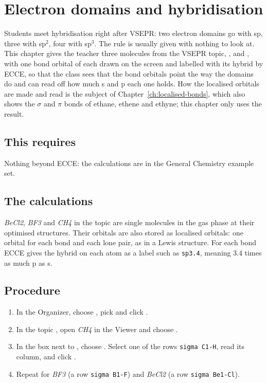 \chapter{Electron domains and hybridisation}
\label{ch:t-hybridisation}

Students meet hybridisation right after VSEPR: two electron domains go with sp, three with sp$^2$, four with sp$^3$. The rule is usually given with nothing to look at. This chapter gives the teacher three molecules from the VSEPR topic, ,  and , with one bond orbital of each drawn on the screen and labelled with its hybrid by ECCE, so that the class sees that the bond orbitals point the way the domains do and can read off how much s and p each one holds. How the localised orbitals are made and read is the subject of Chapter~\ref{ch:localised-bonds}, which also shows the $\sigma$ and $\pi$ bonds of ethane, ethene and ethyne; this chapter only uses the result.

\section*{This requires}
Nothing beyond ECCE: the calculations are in the General Chemistry example set.

\section{The calculations}
\emph{BeCl2}, \emph{BF3} and \emph{CH4} in the topic  are single molecules in the gas phase at their optimised structures. Their orbitals are also stored as localised orbitals: one orbital for each bond and each lone pair, as in a Lewis structure. For each bond ECCE gives the hybrid on each atom as a label such as \texttt{sp3.4}, meaning 3.4 times as much p as s.

\section{Procedure}
\begin{enumerate}
	\item In the Organizer, choose , pick  and click .
	\item In the topic , open \emph{CH4} in the Viewer and choose .
	\item In the box next to , choose . Select one of the rows \texttt{sigma C1-H}, read its  column, and click .
	\item Repeat for \emph{BF3} (a row \texttt{sigma B1-F}) and \emph{BeCl2} (a row \texttt{sigma Be1-Cl}).
\end{enumerate}

